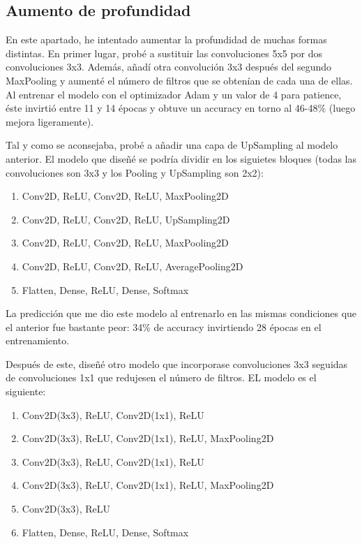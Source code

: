 \documentclass[10pt,a4paper]{article}
\begin{document}
\subsection{Aumento de profundidad}

En este apartado, he intentado aumentar la profundidad de muchas formas distintas. En primer lugar, probé a sustituir las convoluciones 5x5 por dos convoluciones 3x3. Además, añadí otra convolución 3x3 después del segundo MaxPooling y aumenté el número de filtros que se obtenían de cada una de ellas. Al entrenar el modelo con el optimizador Adam y un valor de 4 para patience, éste invirtió entre 11 y 14 épocas y obtuve un accuracy en torno al 46-48\% (luego mejora ligeramente). 

Tal y como se aconsejaba, probé a añadir una capa de UpSampling al modelo anterior. El modelo que diseñé se podría dividir en los siguietes bloques (todas las convoluciones son 3x3 y los Pooling y UpSampling son 2x2):

\begin{enumerate}
\item Conv2D, ReLU, Conv2D, ReLU, MaxPooling2D
\item Conv2D, ReLU, Conv2D, ReLU, UpSampling2D
\item Conv2D, ReLU, Conv2D, ReLU, MaxPooling2D
\item Conv2D, ReLU, Conv2D, ReLU, AveragePooling2D
\item Flatten, Dense, ReLU, Dense, Softmax
\end{enumerate}

La predicción que me dio este modelo al entrenarlo en las mismas condiciones que el anterior fue bastante peor: 34\% de accuracy invirtiendo 28 épocas en el entrenamiento.

Después de este, diseñé otro modelo que incorporase convoluciones 3x3 seguidas de convoluciones 1x1 que redujesen el número de filtros. EL modelo es el siguiente:

\begin{enumerate}
\item Conv2D(3x3), ReLU, Conv2D(1x1), ReLU
\item Conv2D(3x3), ReLU, Conv2D(1x1), ReLU, MaxPooling2D
\item Conv2D(3x3), ReLU, Conv2D(1x1), ReLU
\item Conv2D(3x3), ReLU, Conv2D(1x1), ReLU, MaxPooling2D
\item Conv2D(3x3), ReLU
\item Flatten, Dense, ReLU, Dense, Softmax
\end{enumerate}
\end{document}
